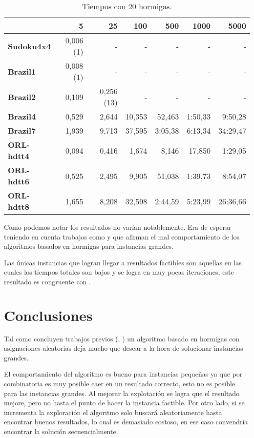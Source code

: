 \documentclass[letter, 10pt]{article}
\renewcommand{\bf}[1]{\textbf{#1}}
\begin{document}
\begin{table}[h]
\centering
\begin{tabular}{|l|r|r|r|r|r|r|}
  \hline
                 & 5         & 25  & 100    & 500    & 1000    & 5000     \\\hline
  \bf{Sudoku4x4} & 0,006 (1) & -   & -      & -      & -       & -        \\\hline
  \bf{Brazil1}   & 0,008 (1) & -   & -      & -      & -       & -        \\\hline
  \bf{Brazil2}   & 0,109  & 0,256 (13) & -  & -      & -       & -        \\\hline
  \bf{Brazil4}   & 0,529  & 2,644  & 10,353 & 52,463 & 1:50,33 & 9:50,28  \\\hline
  \bf{Brazil7}   & 1,939  & 9,713  & 37,595 & 3:05,38& 6:13,34 & 34:29,47 \\\hline
  \bf{ORL-hdtt4} & 0,094  & 0,416  & 1,674  & 8,146  & 17,850  & 1:29,05  \\\hline
  \bf{ORL-hdtt6} & 0,525  & 2,495  & 9,905  & 51,038 & 1:39,73 & 8:54,07  \\\hline
  \bf{ORL-hdtt8} & 1,655  & 8,208  & 32,598 & 2:44,59& 5:23,99 & 26:36,66 \\\hline
\end{tabular}
\caption{Tiempos con 20 hormigas.}\label{tab:20ants:time}
\end{table}

Como podemos notar los resultados no varían notablemente. Era de esperar
teniendo en cuenta trabajos como \cite{socha2003ant} y
\cite{rossi2002comparison} que afirman el mal comportamiento de los algoritmos
basados en hormigas para instancias grandes.

Las únicas instancias que logran llegar a resultados factibles son aquellas en
las cuales los tiempos totales son bajos y se logra en muy pocas iteraciones,
este resultado es congruente con \cite{rossi2002comparison}.

\section{Conclusiones}\label{sec:conc}
Tal como concluyen trabajos previos (\cite{socha2003ant},
\cite{rossi2002comparison}) un algoritmo basado en hormigas con asignaciones
aleatorias deja mucho que desear a la hora de solucionar instancias grandes.

El comportamiento del algoritmo es bueno para instancias pequeñas ya que por
combinatoria es muy posible caer en un resultado correcto, esto no es posible
para las instancias grandes. Al mejorar la explotación se logra que el resultado
mejore, pero no hasta el punto de hacer la instancia factible. Por otro lado, si
se incrementa la exploración el algoritmo solo buscará aleatoriamente hasta
encontrar buenos resultados, lo cual es demasiado costoso, en ese caso
convendría encontrar la solución secuencialmente.
\end{document}
